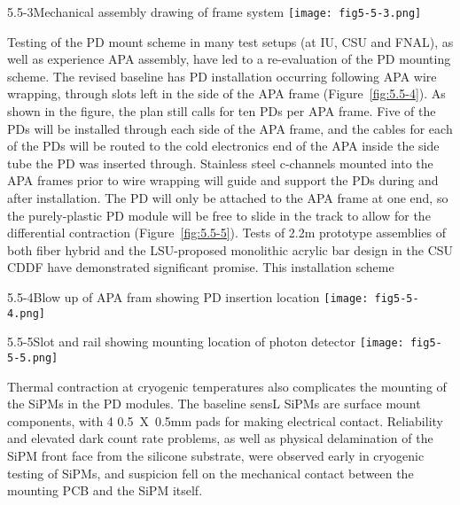 \begin{cdrfigure}{5.5-3}{Mechanical assembly drawing of frame system}
  \texttt{[image: fig5-5-3.png]}
\end{cdrfigure}


Testing of the PD mount scheme in many test setups (at IU, CSU and
FNAL), as well as experience APA assembly, have led to a re-evaluation
of the PD mounting scheme.  The revised baseline has PD installation
occurring following APA wire wrapping, through slots left in the side
of the APA frame (Figure~\ref{fig:5.5-4}).  As shown in the figure, the
plan still calls for ten PDs per APA frame.  Five of the PDs will be
installed through each side of the APA frame, and the cables for each
of the PDs will be routed to the cold electronics end of the APA
inside the side tube the PD was inserted through.  Stainless steel
c-channels mounted into the APA frames prior to wire wrapping will
guide and support the PDs during and after installation.  The PD will
only be attached to the APA frame at one end, so the purely-plastic PD
module will be free to slide in the track to allow for the
differential contraction (Figure~\ref{fig:5.5-5}).  Tests of 2.2m prototype
assemblies of both fiber hybrid and the LSU-proposed monolithic
acrylic bar design in the CSU CDDF have demonstrated significant
promise.  This installation scheme

\begin{cdrfigure}{5.5-4}{Blow up of APA fram showing PD insertion location}
  \texttt{[image: fig5-5-4.png]}
\end{cdrfigure}


\begin{cdrfigure}{5.5-5}{Slot and rail showing mounting location of photon detector}
  \texttt{[image: fig5-5-5.png]}
\end{cdrfigure}


Thermal contraction at cryogenic temperatures also complicates the
mounting of the SiPMs in the PD modules.  The baseline sensL SiPMs are
surface mount components, with 4 0.5~X~0.5mm pads for making
electrical contact.  Reliability and elevated dark count rate
problems, as well as physical delamination of the SiPM front face from
the silicone substrate, were observed early in cryogenic testing of
SiPMs, and suspicion fell on the mechanical contact between the
mounting PCB and the SiPM itself.

